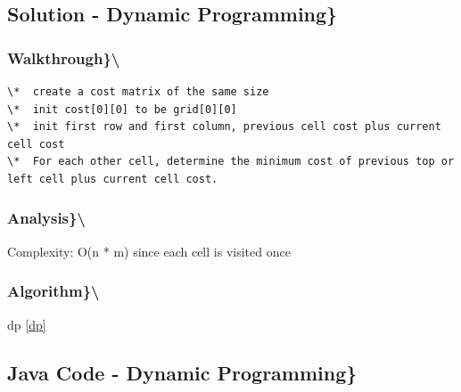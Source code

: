 \documentclass[]{book}
\begin{document}
\hypertarget{solution---dynamic-programming}{%
\subsection{Solution - Dynamic Programming\}}\label{solution---dynamic-programming}}

\hypertarget{walkthrough-45}{%
\subsubsection{Walkthrough\}\textbackslash{}}\label{walkthrough-45}}

\begin{verbatim}
\*  create a cost matrix of the same size
\*  init cost[0][0] to be grid[0][0]
\*  init first row and first column, previous cell cost plus current cell cost
\*  For each other cell, determine the minimum cost of previous top or left cell plus current cell cost.
\end{verbatim}

\hypertarget{analysis-50}{%
\subsubsection{Analysis\}\textbackslash{}}\label{analysis-50}}

Complexity: O(n * m) since each cell is visited once

\hypertarget{algorithm-50}{%
\subsubsection{Algorithm\}\textbackslash{}}\label{algorithm-50}}

dp \ref{dp}

\hypertarget{java-code---dynamic-programming}{%
\subsection{Java Code - Dynamic Programming\}}\label{java-code---dynamic-programming}}
\end{document}
